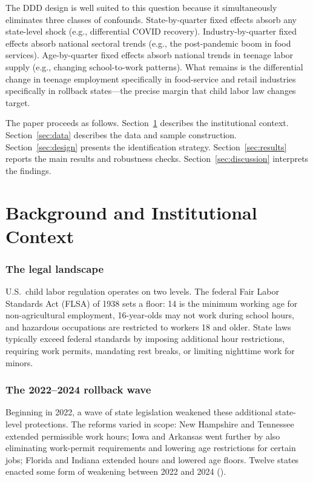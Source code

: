 \documentclass[12pt]{article}
\begin{document}
The DDD design is well suited to this question because it simultaneously eliminates three classes of confounds. State-by-quarter fixed effects absorb any state-level shock (e.g., differential COVID recovery). Industry-by-quarter fixed effects absorb national sectoral trends (e.g., the post-pandemic boom in food services). Age-by-quarter fixed effects absorb national trends in teenage labor supply (e.g., changing school-to-work patterns). What remains is the differential change in teenage employment specifically in food-service and retail industries specifically in rollback states---the precise margin that child labor law changes target.

The paper proceeds as follows. Section~\ref{sec:background} describes the institutional context. Section~\ref{sec:data} describes the data and sample construction. Section~\ref{sec:design} presents the identification strategy. Section~\ref{sec:results} reports the main results and robustness checks. Section~\ref{sec:discussion} interprets the findings.

\section{Background and Institutional Context}\label{sec:background}

\subsubsection*{The legal landscape} U.S.\ child labor regulation operates on two levels. The federal Fair Labor Standards Act (FLSA) of 1938 sets a floor: 14 is the minimum working age for non-agricultural employment, 16-year-olds may not work during school hours, and hazardous occupations are restricted to workers 18 and older. State laws typically exceed federal standards by imposing additional hour restrictions, requiring work permits, mandating rest breaks, or limiting nighttime work for minors.

\subsubsection*{The 2022--2024 rollback wave} Beginning in 2022, a wave of state legislation weakened these additional state-level protections. The reforms varied in scope: New Hampshire and Tennessee extended permissible work hours; Iowa and Arkansas went further by also eliminating work-permit requirements and lowering age restrictions for certain jobs; Florida and Indiana extended hours and lowered age floors. Twelve states enacted some form of weakening between 2022 and 2024 ().
\end{document}
